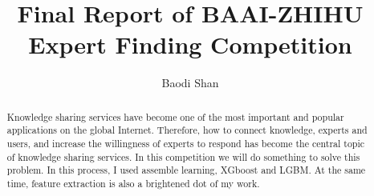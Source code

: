 \documentclass[sigconf]{acmart}
\begin{document}
\title{Final Report of BAAI-ZHIHU Expert Finding Competition}

\author{Baodi Shan}











\renewcommand{\shortauthors}{Trovato and Tobin, et al.}

\begin{abstract}
   Knowledge sharing services have become one of the most important and popular applications on the global Internet. Therefore, how to connect knowledge, experts and users, and increase the willingness of experts to respond has become the central topic of knowledge sharing services. In this competition we will do something to solve this problem. In this process, I used assemble learning, XGboost and LGBM. At the same time, feature extraction is also a 	brightened dot of my work.
\end{abstract}




\end{document}
